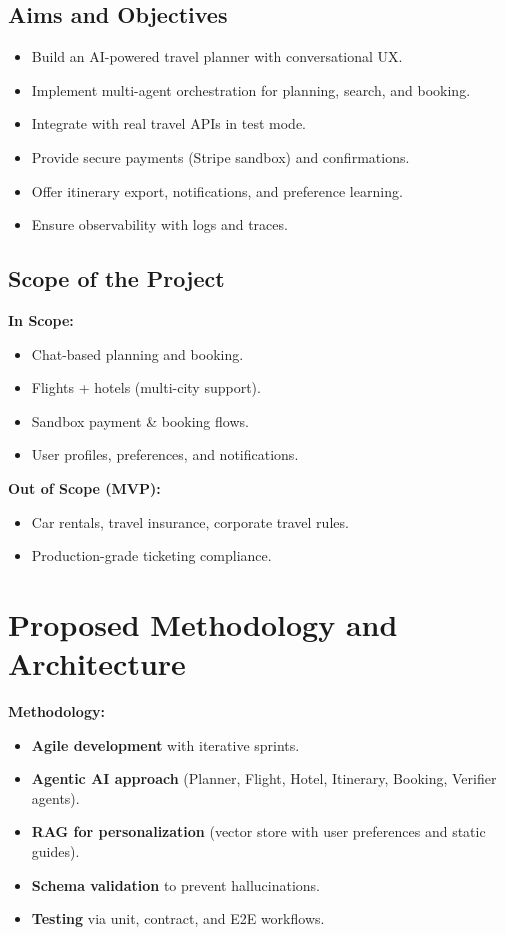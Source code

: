 \documentclass[12pt,a4paper]{article}
\begin{document}
\subsection{Aims and Objectives}

\begin{itemize}
\item Build an AI-powered travel planner with conversational UX.
\item Implement multi-agent orchestration for planning, search, and booking.
\item Integrate with real travel APIs in test mode.
\item Provide secure payments (Stripe sandbox) and confirmations.
\item Offer itinerary export, notifications, and preference learning.
\item Ensure observability with logs and traces.
\end{itemize}

\subsection{Scope of the Project}

\textbf{In Scope:}

\begin{itemize}
\item Chat-based planning and booking.
\item Flights + hotels (multi-city support).
\item Sandbox payment \& booking flows.
\item User profiles, preferences, and notifications.
\end{itemize}

\textbf{Out of Scope (MVP):}

\begin{itemize}
\item Car rentals, travel insurance, corporate travel rules.
\item Production-grade ticketing compliance.
\end{itemize}

\section{Proposed Methodology and Architecture}

\textbf{Methodology:}

\begin{itemize}
\item \textbf{Agile development} with iterative sprints.
\item \textbf{Agentic AI approach} (Planner, Flight, Hotel, Itinerary, Booking, Verifier agents).
\item \textbf{RAG for personalization} (vector store with user preferences and static guides).
\item \textbf{Schema validation} to prevent hallucinations.
\item \textbf{Testing} via unit, contract, and E2E workflows.
\end{itemize}
\end{document}
